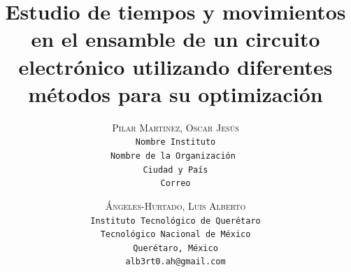     \lfoot{ \thepage}
    
    \setlength{\droptitle}{-5\baselineskip} %
    \title{\textbf{Estudio de tiempos y movimientos en el ensamble de un circuito electrónico utilizando diferentes métodos para su optimización }} %
    
     \author{ 
     \textsc{Pilar Martinez, Oscar Jesús}\\ 
     \texttt{ Nombre Instituto } \\ 
     \texttt{Nombre de la Organización } \\ 
     \texttt{Ciudad y País}\\ 
     \texttt{Correo} 
     \and 
     \textsc{Ángeles-Hurtado, Luis Alberto}\\ 
     \texttt{ Instituto Tecnológico de Querétaro } \\ 
     \texttt{ Tecnológico Nacional de México } \\ 
     \texttt{Querétaro, México}\\ 
     \texttt{alb3rt0.ah@gmail.com} 
    }
    
    
    
    
    \maketitle
    \thispagestyle{fancy}
    
